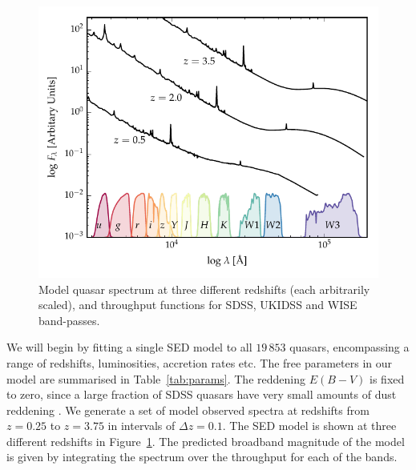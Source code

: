 
\begin{figure}
  \centering
  \includegraphics[width=\textwidth]{figures/chapter05/throughput.pdf}
  \caption[{Model quasar spectrum at three different redshifts, and throughput functions for SDSS, UKIDSS and WISE band-passes.}]{Model quasar spectrum at three different redshifts (each arbitrarily scaled), and throughput functions for SDSS, UKIDSS and WISE band-passes.}
  \label{fig:filters}
\end{figure}

We will begin by fitting a single SED model to all $19\,853$ quasars, encompassing a range of redshifts, luminosities, accretion rates etc. 
The free parameters in our model are summarised in Table~\ref{tab:params}. 
The reddening $E(B-V)$ is fixed to zero, since a large fraction of SDSS quasars have very small amounts of dust reddening \citep{richards03}. 
We generate a set of model observed spectra at redshifts from $z=0.25$ to $z=3.75$ in intervals of $\Delta z = 0.1$. 
The SED model is shown at three different redshifts in Figure~\ref{fig:filters}. 
The predicted broadband magnitude of the model is given by integrating the spectrum over the throughput for each of the bands.  


